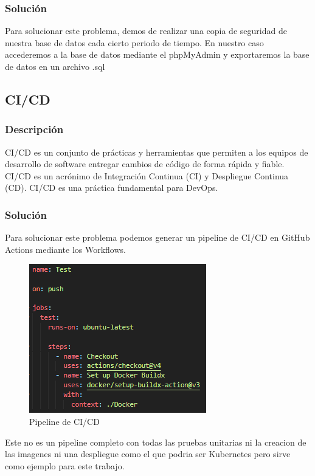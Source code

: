 \documentclass{report}
\begin{document}
                \subsubsection{Solución}
                    Para solucionar este problema, demos de realizar una copia de seguridad de nuestra base de datos cada cierto periodo de tiempo.
                    En nuestro caso accederemos a la base de datos mediante el phpMyAdmin y exportaremos la base de datos en un archivo .sql
            \clearpage
            \subsection{CI/CD}
                \subsubsection{Descripción}
                    CI/CD es un conjunto de prácticas y herramientas que permiten a los equipos de desarrollo de software entregar cambios de código de forma rápida y fiable. CI/CD es un acrónimo de Integración Continua (CI) y Despliegue Continua (CD). CI/CD es una práctica fundamental para DevOps.
                \subsubsection{Solución}
                    Para solucionar este problema podemos generar un pipeline de CI/CD en GitHub Actions mediante los Workflows.
                    \begin{figure}[H]
                        \centering
                        \includegraphics[width=\textwidth]{./img/vulnerabilidades/3.8/2.1.png}
                        \caption{Pipeline de CI/CD}
                    \end{figure}
                    Este no es un pipeline completo con todas las pruebas unitarias ni la creacion de las imagenes ni una despliegue como el que podria ser Kubernetes pero sirve como ejemplo para este trabajo.
            \clearpage
\end{document}
